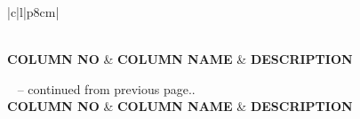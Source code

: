 \documentclass[a4paper]{article}
\begin{document}
\begin{longtable}{|c|l|p{8cm}|}
			\caption{Column Description} \label{tab:column_description} \\
			\hline
			\textbf{COLUMN NO} & \textbf{COLUMN NAME} & \textbf{DESCRIPTION} \\
			\hline
			\endfirsthead
			
			{{\tablename\ \thetable{} -- continued from previous page..}} \\
		
			\hline	
			\textbf{COLUMN NO} & \textbf{COLUMN NAME} & \textbf{DESCRIPTION} \\
			\hline
			\endhead
			
			\hline {} \\ \hline
			\endfoot
			
			\hline
			\endlastfoot
		

\end{longtable}
\end{document}
